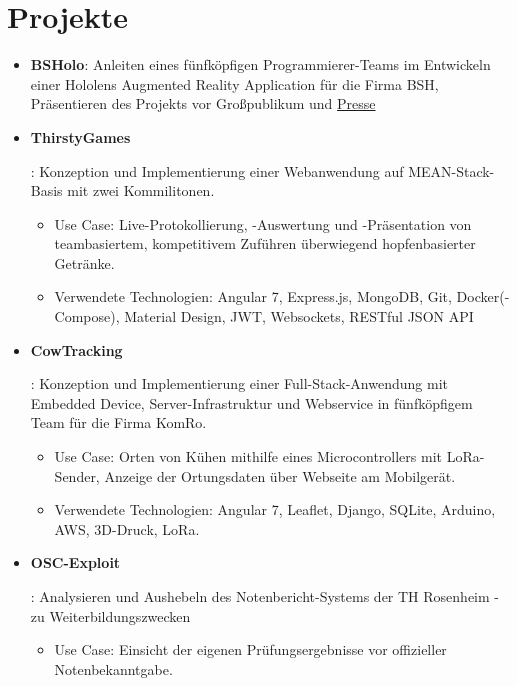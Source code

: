 \documentclass[letterpaper,11pt]{article}
\newcommand{\resumeItemWithoutHeadline}[1]{
	\item\small{
		{#1 \vspace{-2pt}}
	}
}
\newcommand{\resumeSubHeadingListStart}{\begin{itemize}[leftmargin=*]}
\newcommand{\resumeSubHeadingListEnd}{\end{itemize}}
\newcommand{\resumeItemListStart}{\begin{itemize}}
\newcommand{\resumeItemListEnd}{\end{itemize}\vspace{-5pt}}
\begin{document}
\section{Projekte}
\resumeSubHeadingListStart
\item{
	\textbf{BSHolo}{: 	\linebreak 
		Anleiten eines fünfköpfigen Programmierer-Teams im Entwickeln einer Hololens Augmented Reality Application für die Firma BSH, Präsentieren des Projekts vor Großpublikum und \href{https://www.rfo.de/mediathek/video/projektmesse-an-der-hochschule-rosenheim/}{Presse}
}}
\item{
	\textbf{ThirstyGames}{: 	\linebreak 
		Konzeption und Implementierung einer Webanwendung auf MEAN-Stack-Basis mit zwei Kommilitonen.
	\resumeItemListStart
		\resumeItemWithoutHeadline
		{Use Case: \linebreak
		Live-Protokollierung, -Auswertung und -Präsentation von teambasiertem, kompetitivem Zuführen überwiegend hopfenbasierter Getränke.}
		\resumeItemWithoutHeadline
		{Verwendete Technologien: \linebreak
		Angular 7, Express.js, MongoDB, Git, Docker(-Compose), Material Design, JWT, Websockets, RESTful JSON API }
	\resumeItemListEnd
}}
\item{
	\textbf{CowTracking}{: 	\linebreak 
		Konzeption und Implementierung einer Full-Stack-Anwendung mit Embedded Device, Server-Infrastruktur und Webservice in fünfköpfigem Team für die Firma KomRo.
	\resumeItemListStart
		\resumeItemWithoutHeadline
		{Use Case: \linebreak
		Orten von Kühen mithilfe eines Microcontrollers mit LoRa-Sender, Anzeige der Ortungsdaten über Webseite am Mobilgerät.}
		\resumeItemWithoutHeadline
		{Verwendete Technologien: \linebreak
		Angular 7, Leaflet, Django, SQLite, Arduino, AWS, 3D-Druck, LoRa.}
	\resumeItemListEnd
}}
\item{
	\textbf{OSC-Exploit}{: 	\linebreak 
		Analysieren und Aushebeln des Notenbericht-Systems der TH Rosenheim - zu Weiterbildungszwecken	
	\resumeItemListStart
		\resumeItemWithoutHeadline
		{Use Case: Einsicht der eigenen Prüfungsergebnisse vor offizieller Notenbekanntgabe.}
	\resumeItemListEnd
}}
\resumeSubHeadingListEnd

\end{document}
